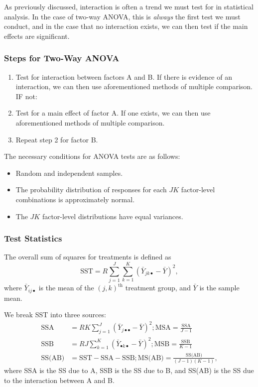 \documentclass[12pt]{article}
\begin{document}
As previously discussed, interaction is often a trend we must test for in statistical analysis. In the case of two-way ANOVA, this is \textit{always} the first test we must conduct, and in the case that no interaction exists, we can then test if the main effects are significant. 

\subsubsection{Steps for Two-Way ANOVA}
\begin{enumerate}[label=\bf Step \arabic*:]
    \item Test for interaction between factors A and B. If there is evidence of an interaction, we can then use aforementioned methods of multiple comparison. IF not:
    \item Test for a main effect of factor A. If one exists, we can then use aforementioned methods of multiple comparison.
    \item Repeat step 2 for factor B.
\end{enumerate}

The necessary conditions for ANOVA tests are as follows: \begin{itemize}
    \item Random and independent samples.
    \item The probability distribution of responses for each $JK$ factor-level combinations is approximately normal.
    \item The $JK$ factor-level distributions have equal variances.
\end{itemize}

\subsubsection{Test Statistics}

The overall sum of squares for treatments is defined as \[\text{SST} = R \sum_{j=1}^J \sum_{k=1}^K (\bar{Y}_{jk\bullet} - \bar{Y})^2,\] where $\bar{Y}_{ij\bullet}$ is the mean of the $(j,k)^{\text{th}}$ treatment group, and $\bar{Y}$ is the sample mean. 

We break SST into three sources: \begin{align*}
    \text{SSA} &= RK \sum_{j=1}^J (\bar{Y}_{j\bullet\bullet} - \bar{Y})^2; \text{MSA} = \frac{\text{SSA}}{J-1}\\
    \text{SSB} &= RJ \sum_{k=1}^K (\bar{Y}_{\bullet k\bullet} - \bar{Y})^2; \text{MSB} = \frac{\text{SSB}}{K-1}\\
    \text{SS(AB)} &= \text{SST} - \text{SSA} - \text{SSB}; \text{MS(AB)} = \frac{\text{SS(AB)}}{(J-1)(K-1)},
\end{align*}
where SSA is the SS due to A, SSB is the SS due to B, and SS(AB) is the SS due to the interaction between A and B.
\end{document}
